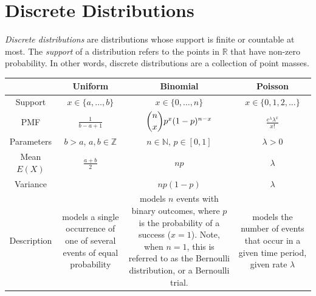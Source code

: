 \label{lab:distributions}

\section*{Discrete Distributions}
\emph{Discrete distributions} are distributions whose support is finite or countable at most. 
The \emph{support} of a distribution refers to the points in $\mathbb{R}$ that have non-zero probability. 
In other words, discrete distributions are a collection of point masses. 

\begin{table}[h]
\centering
\begin{tabular}{|c|c|c|c|}
	\hline
 & Uniform &  Binomial & Poisson \\
\hline 
\hline
Support&$x \in \{a,\dots,b\}$&$x \in \{0,\dots,n\}$&$x \in \{0,1,2,\dots\}$\\ \hline
PMF&$\frac{1}{b-a+1}$&$\dbinom{n}{x}p^x(1-p)^{n-x}$&$\frac{e^\lambda \lambda^x}{x!}$\\ \hline
Parameters&$b>a$, $a,b \in \mathbb{Z}$&$n \in \mathbb{N}$, $p \in [0,1]$& $\lambda>0$\\ \hline
Mean $E(X)$&$\frac{a+b}{2}$&$np$& $\lambda$\\ \hline
Variance&&$np(1-p)$& $\lambda$\\ \hline
Description& 
\parbox{1in}{models a single occurrence of one of several events of equal probability} & \parbox{1in}{models $n$ events with binary outcomes, where $p$ is the probability of a success ($x=1$). Note, when $n=1$, this is referred to as the Bernoulli distribution, or a Bernoulli trial.}&\parbox{1in}{models the number of events that occur in a given time period, given rate $\lambda$}\\
\hline
\end{tabular}
\end{table}

